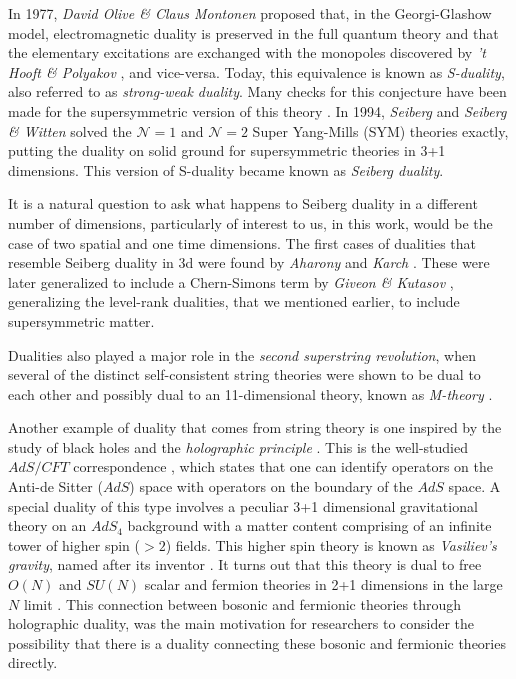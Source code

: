 In 1977, \textit{David Olive \& Claus Montonen} \cite{Montonen:1977sn} proposed that, in the Georgi-Glashow model, electromagnetic duality is preserved in the full quantum theory and that the elementary excitations are exchanged with the monopoles discovered by \textit{'t Hooft \& Polyakov} \cite{Polyakov:1974ek, tHooft:1974kcl}, and vice-versa. Today, this equivalence is known as \textit{S-duality}, also referred to as \textit{strong-weak duality}. Many checks for this conjecture have been made for the supersymmetric version of this theory \cite{Osborn:1979tq, Witten:1978mh, Sen:1994yi, Vafa:1994tf}. In 1994, \textit{Seiberg} \cite{Seiberg:1994bz, Seiberg:1994pq} and \textit{Seiberg \& Witten} \cite{Seiberg:1994rs} solved the $\mathcal{N}=1$ and $\mathcal{N}=2$ Super Yang-Mills (SYM) theories exactly, putting the duality on solid ground for supersymmetric theories in 3+1 dimensions. This version of S-duality became known as \textit{Seiberg duality}.

It is a natural question to ask what happens to Seiberg duality in a different number of dimensions, particularly of interest to us, in this work, would be the case of two spatial and one time dimensions. The first cases of dualities that resemble Seiberg duality in 3d were found by \textit{Aharony} and \textit{Karch} \cite{Aharony:1997gp, Karch:1997ux}. These were later generalized to include a Chern-Simons term by \textit{Giveon \& Kutasov} \cite{Giveon:2008zn}, generalizing the level-rank dualities, that we mentioned earlier, to include supersymmetric matter.

Dualities also played a major role in the \textit{second superstring revolution}, when several of the distinct self-consistent string theories were shown to be dual to each other \cite{Sen:1994fa, Schwarz:1994xn, Sathiapalan:1986zb, Hull:1994ys} and possibly dual to an 11-dimensional theory, known as \textit{M-theory} \cite{Witten:1995ex}.

Another example of duality that comes from string theory is one inspired by the study of black holes and the \textit{holographic principle} \cite{Susskind:1994vu, tHooft:1993dmi}. This is the well-studied $AdS/CFT$ correspondence \cite{Aharony:1999ti, Maldacena:1997re}, which states that one can identify operators on the Anti-de Sitter ($AdS$) space with operators on the boundary of the $AdS$ space. A special duality of this type involves a peculiar 3+1 dimensional gravitational theory on an $AdS_4$ background with a matter content comprising of an infinite tower of higher spin ($>2$) fields. This higher spin theory is known as \textit{Vasiliev's gravity}, named after its inventor \cite{Vasiliev:1992av}. It turns out that this theory is dual to free $O(N)$ and $SU(N)$ scalar and fermion theories in 2+1 dimensions in the large $N$ limit \cite{Sezgin:2003pt, Klebanov:2002ja}. This connection between bosonic and fermionic theories through holographic duality, was the main motivation for researchers to consider the possibility that there is a duality connecting these bosonic and fermionic theories directly. 

